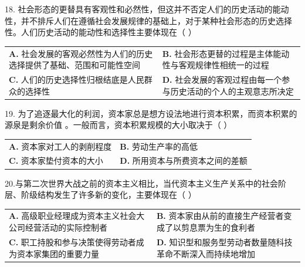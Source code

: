\documentclass[UTF8,11pt]{ctexart}
\begin{document}
18. 社会形态的更替具有客观性和必然性，但这并不否定人们的历史活动的能动性，并不排斥人们在遵循社会发展规律的基础上，对于某种社会形态的历史选择性。人们历史活动的能动性和选择性主要体现在（      ）


\begin{center}\begin{tabular}{>{\raggedright\arraybackslash}p{\dimexpr(\linewidth-4\tabcolsep)/2\relax}>{\raggedright\arraybackslash}p{\dimexpr(\linewidth-4\tabcolsep)/2\relax}}
\textbf{A.} 社会发展的客观必然性为人们的历史选择提供了基础、范围和可能性空间 & \textbf{B.} 社会形态更替的过程是主体能动性与客观规律性相统一的过程\\[.35em]
\textbf{C.} 人们的历史选择性归根结底是人民群众的选择性 & \textbf{D.} 社会发展的客观过程由每一个参与历史活动的个人的主观意志所决定\\[.35em]\end{tabular}\end{center}

19. 为了追逐最大化的利润，资本家总是想方设法地进行资本积累，而资本积累的源泉是剩余价值 。一般而言，资本积累规模的大小取决于（      ）


\begin{center}\begin{tabular}{>{\raggedright\arraybackslash}p{\dimexpr(\linewidth-4\tabcolsep)/2\relax}>{\raggedright\arraybackslash}p{\dimexpr(\linewidth-4\tabcolsep)/2\relax}}
\textbf{A.} 资本家对工人的剥削程度 & \textbf{B.} 劳动生产率的高低\\[.35em]
\textbf{C.} 资本家垫付资本的大小 & \textbf{D.} 所用资本与所费资本之间的差额\\[.35em]\end{tabular}\end{center}

20.与第二次世界大战之前的资本主义相比，当代资本主义生产关系中的社会阶层、阶级结构发生了许多新的变化，主要体现在（      ）


\begin{center}\begin{tabular}{>{\raggedright\arraybackslash}p{\dimexpr(\linewidth-4\tabcolsep)/2\relax}>{\raggedright\arraybackslash}p{\dimexpr(\linewidth-4\tabcolsep)/2\relax}}
\textbf{A.} 高级职业经理成为资本主义社会大公司经营活动的实际控制者 & \textbf{B.} 资本家由从前的直接生产经营者变成了以剪息票为生的食利者\\[.35em]
\textbf{C.} 职工持股和参与决策使得劳动者成为资本家集团的重要力量 & \textbf{D.} 知识型和服务型劳动者数量随科技革命不断深入而持续地增加\\[.35em]\end{tabular}\end{center}
\end{document}
